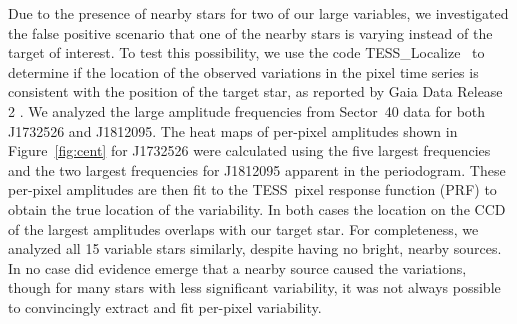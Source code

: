 \documentclass[twocolumn]{aastex631}
\newcommand{\tess}{TESS}
\newcommand{\tesslocalize}{{{\fontfamily{lmtt}\selectfont TESS\_Localize}}}
\begin{document}

Due to the presence of nearby stars for two of our large variables, we investigated the false positive scenario that one of the nearby stars is varying instead of the target of interest. To test this possibility, we use the code \tesslocalize\ \citep{HiggensBell} to determine if the location of the observed variations in the pixel time series is consistent with the position of the target star, as reported by Gaia Data Release 2 \citep{gaiaDR22018}.  We analyzed the large amplitude frequencies from Sector~40 data for both J1732526 and J1812095. The heat maps of per-pixel amplitudes shown in Figure~\ref{fig:cent} for J1732526 were calculated using the five largest frequencies and the two largest frequencies for J1812095 apparent in the periodogram.  These per-pixel amplitudes are then fit to the \tess\ pixel response function (PRF) to obtain the true location of the variability. In both cases the location on the CCD of the largest amplitudes overlaps with our target star.  For completeness, we analyzed all 15 variable stars similarly, despite having no bright, nearby sources. In no case did evidence emerge that a nearby source caused the variations, though for many stars with less significant variability, it was not always possible to convincingly extract and fit per-pixel variability.



\vspace{-1em}
\end{document}
